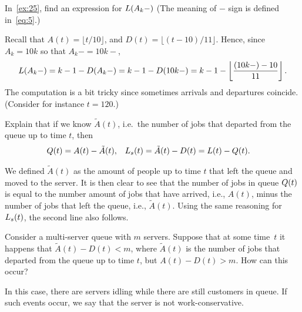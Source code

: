 \begin{exercise}\label{ex:97}
In~\cref{ex:25},  find an expression for $L(A_k-)$ (The meaning of $-$ sign is defined in~\cref{eq:5}.)
\begin{solution}
Recall that $A(t) = \lfloor t/10\rfloor$, and $D(t) = \lfloor (t-10)/11 \rfloor$.
  Hence, since $A_k = 10 k$ so that $A_k- = 10k-$,
 \begin{equation*}
 L(A_k-) = k-1 - D(A_k-) = k- 1 - D(10k-) = k- 1 - \left \lfloor \frac{(10k-)-10}{11} \right \rfloor.
 \end{equation*}
 The computation is a bit tricky since sometimes arrivals and departures coincide. (Consider for instance $t=120$.)

\end{solution}
\end{exercise}


\begin{exercise}
  Explain  that if we know $\tilde A(t)$, i.e.\ the number of jobs that departed from the queue up to time $t$, then
\begin{align*}
 Q(t) &= A(t) - \tilde A(t), & L_s(t) &= \tilde A(t) - D(t) = L(t) - Q(t).
\end{align*}
\begin{solution}
  We defined $\tilde A(t)$ as the amount of people up to time $t$ that left the queue and moved to the server.
  It is then clear to see that the number of jobs in queue $Q(t)$ is equal to the number amount of jobs that have arrived, i.e., $A(t)$, minus the number of jobs that left the queue, i.e., $\tilde A(t)$.
  Using the same reasoning for $L_s(t)$,  the second line also follows.
\end{solution}
\end{exercise}

\begin{exercise}
  Consider
  a multi-server queue with $m$ servers.
  Suppose that at some time~$t$ it happens that $\tilde A(t) - D(t) < m$, where $\tilde A(t)$ is the number of jobs that departed from the queue up to time $t$, but $A(t) - D(t) > m$.
  How can this occur?
\begin{solution}
  In this case, there are servers idling while there are still customers in queue.
  If such events occur, we say that the server is not work-conservative.
\end{solution}
\end{exercise}


